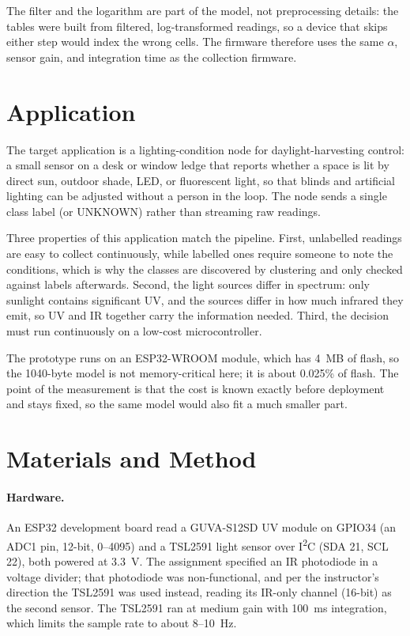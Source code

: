 \documentclass[10pt,a4paper,twocolumn]{article}
\begin{document}
The filter and the logarithm are part of the model, not preprocessing details: the tables were built from filtered, log-transformed readings, so a device that skips either step would index the wrong cells. The firmware therefore uses the same $\alpha$, sensor gain, and integration time as the collection firmware.

\section{Application}

The target application is a lighting-condition node for daylight-harvesting control: a small sensor on a desk or window ledge that reports whether a space is lit by direct sun, outdoor shade, LED, or fluorescent light, so that blinds and artificial lighting can be adjusted without a person in the loop. The node sends a single class label (or UNKNOWN) rather than streaming raw readings.

Three properties of this application match the pipeline. First, unlabelled readings are easy to collect continuously, while labelled ones require someone to note the conditions, which is why the classes are discovered by clustering and only checked against labels afterwards. Second, the light sources differ in spectrum: only sunlight contains significant UV, and the sources differ in how much infrared they emit, so UV and IR together carry the information needed. Third, the decision must run continuously on a low-cost microcontroller.

The prototype runs on an ESP32-WROOM module, which has 4~MB of flash, so the 1040-byte model is not memory-critical here; it is about 0.025\% of flash. The point of the measurement is that the cost is known exactly before deployment and stays fixed, so the same model would also fit a much smaller part.

\section{Materials and Method}
\label{sec:method}

\paragraph{Hardware.} An ESP32 development board read a GUVA-S12SD UV module on GPIO34 (an ADC1 pin, 12-bit, 0--4095) and a TSL2591 light sensor over I\textsuperscript{2}C (SDA 21, SCL 22), both powered at 3.3~V. The assignment specified an IR photodiode in a voltage divider; that photodiode was non-functional, and per the instructor's direction the TSL2591 was used instead, reading its IR-only channel (16-bit) as the second sensor. The TSL2591 ran at medium gain with 100~ms integration, which limits the sample rate to about 8--10~Hz.
\end{document}

